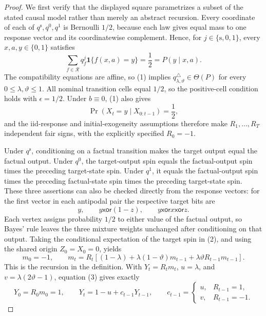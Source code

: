 \documentclass{article}
\begin{document}
\begin{proof}
We first verify that the displayed square parametrizes a subset of the stated causal model rather than merely an abstract recursion.  Every coordinate of each of \(q^{\mathrm s},q^0,q^1\) is Bernoulli \(1/2\), because each law gives equal mass to one response vector and its coordinatewise complement.  Hence, for \(j\in\{\mathrm s,0,1\}\), every \(x,a,y\in\{0,1\}\) satisfies
\[
 \sum_{f\in\mathcal R}q^j_f\mathbf 1\{f(x,a)=y\}=\frac12=P(y\mid x,a).
 \tag{1}
\]
The compatibility equations are affine, so (1) implies \(q^{\triangle}_{\lambda,\vartheta}\in\Theta(P)\) for every \(0\leq\lambda,\vartheta\leq1\).  All nominal transition cells equal \(1/2\), so the positive-cell condition holds with \(\epsilon=1/2\).  Under \(b\equiv0\), (1) also gives
\[
 \Pr(X_t=y\mid X_{0:t-1})=\frac12,
\]
and the iid-response and initial-exogeneity assumptions therefore make \(R_1,\ldots,R_T\) independent fair signs, with the explicitly specified \(R_0=-1\).

Under \(q^{\mathrm s}\), conditioning on a factual transition makes the target output equal the factual output.  Under \(q^0\), the target-output spin equals the factual-output spin times the preceding target-state spin.  Under \(q^1\), it equals the factual-output spin times the preceding factual-state spin times the preceding target-state spin.  These three assertions can also be checked directly from the response vectors: for the first vector in each antipodal pair the respective target bits are
\[
 y,\qquad y\mathbin{\mathsf{xor}}(1-z),\qquad
 y\mathbin{\mathsf{xor}}x\mathbin{\mathsf{xor}}z.
 \tag{2}
\]
Each vertex assigns probability \(1/2\) to either value of the factual output, so Bayes' rule leaves the three mixture weights unchanged after conditioning on that output.  Taking the conditional expectation of the target spin in (2), and using the shared origin \(Z_0=X_0=0\), yields
\[
 m_0=-1,\qquad
 m_t=R_t\left[(1-\lambda)+\lambda(1-\vartheta)m_{t-1}
                 +\lambda\vartheta R_{t-1}m_{t-1}\right].
 \tag{3}
\]
This is the recursion in the definition.  With \(Y_t=R_tm_t\), \(u=\lambda\), and \(v=\lambda(2\vartheta-1)\), equation (3) gives exactly
\[
 Y_0=R_0m_0=1,\qquad
 Y_t=1-u+c_{t-1}Y_{t-1},\qquad
 c_{t-1}=\begin{cases}u,&R_{t-1}=1,\\v,&R_{t-1}=-1.\end{cases}
 \tag{4}
\]


\end{proof}
\end{document}
